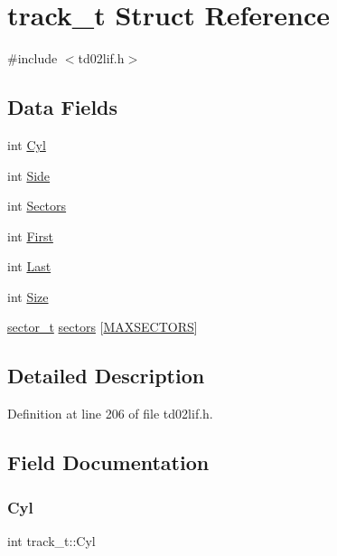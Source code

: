 \hypertarget{structtrack__t}{}\section{track\+\_\+t Struct Reference}
\label{structtrack__t}


{\ttfamily \#include $<$td02lif.\+h$>$}

\subsection*{Data Fields}
\begin{DoxyCompactItemize}
\item 
int \hyperlink{structtrack__t_ab0489765c2499c501ce16426ec2b0c86}{Cyl}
\item 
int \hyperlink{structtrack__t_ad8ed890a8194525d7162dee414180635}{Side}
\item 
int \hyperlink{structtrack__t_a9a073d98f27d50ffda7991ea8099f269}{Sectors}
\item 
int \hyperlink{structtrack__t_a1ffa3863c3fb622cb158e5275c99c55c}{First}
\item 
int \hyperlink{structtrack__t_a9ebaf56b7b9c814e5e9c39dea130fa18}{Last}
\item 
int \hyperlink{structtrack__t_ab0e996e402d1d61b694b80a1c866177e}{Size}
\item 
\hyperlink{structsector__t}{sector\+\_\+t} \hyperlink{structtrack__t_af5a5bc7c09b032d06fe21a18f08772db}{sectors} \mbox{[}\hyperlink{td02lif_8h_a39ad5a6dea9e9b9d5314d32f397fee7d}{M\+A\+X\+S\+E\+C\+T\+O\+RS}\mbox{]}
\end{DoxyCompactItemize}


\subsection{Detailed Description}


Definition at line 206 of file td02lif.\+h.



\subsection{Field Documentation}
\mbox{\label{structtrack__t_ab0489765c2499c501ce16426ec2b0c86}} 
\subsubsection{\texorpdfstring{Cyl}{Cyl}}
{\footnotesize\ttfamily int track\+\_\+t\+::\+Cyl}



